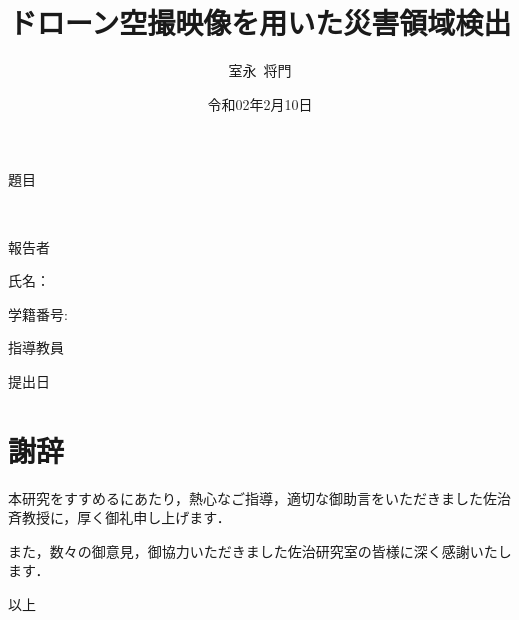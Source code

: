\documentclass[a4paper]{jreport}	%
\title{ドローン空撮映像を用いた災害領域検出}
\author{室永\ 将門}
\date{令和02年2月10日}
\makeatletter
\renewcommand{\maketitle}{
      \vspace*{20mm}
      \begin{center}
        {\huge \@thesis \par}
        \vspace{10mm}
        {\huge 題目 \par}
        {\huge\ \@title \par}
        \vspace{10mm}
        {\LARGE 報告者 \par}
        {\LARGE 氏名：\ \@author \par}
        {\LARGE 学籍番号:\ \@id \par}
        \vspace{10mm}
        {\LARGE 指導教員 \par}
        {\LARGE \@teacher \par}
        \vspace{20mm}
        {\Large 提出日 \par}
        {\Large \@date \par}
        {\Large \@department \par}
      \end{center}
    }
\makeatother
\begin{document}
  \begin{titlepage}
    \maketitle
  \end{titlepage}


  \tableofcontents

  
  
  
  

  
  

  \chapter*{謝辞} %
    \label{cha:謝辞}

    本研究をすすめるにあたり，熱心なご指導，適切な御助言をいただきました佐治斉教授に，厚く御礼申し上げます．

    また，数々の御意見，御協力いただきました佐治研究室の皆様に深く感謝いたします．

    \vspace*{3ex}
    \begin{flushright}
      以上
    \end{flushright}
\end{document}
